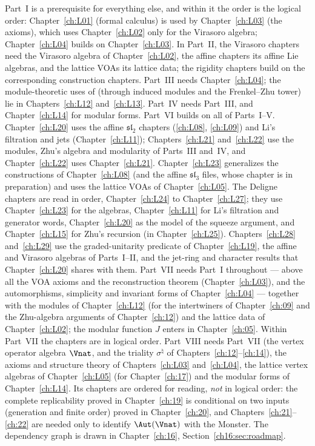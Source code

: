 Part~I is a prerequisite for everything else, and within it the order is the logical order:
Chapter~\ref{ch:L01} (formal calculus) is used by Chapter~\ref{ch:L03} (the axioms), which uses
Chapter~\ref{ch:L02} only for the Virasoro algebra; Chapter~\ref{ch:L04} builds on
Chapter~\ref{ch:L03}. In Part~II, the Virasoro chapters need the Virasoro algebra of
Chapter~\ref{ch:L02}, the affine chapters its affine Lie algebras, and the lattice VOAs its lattice
data; the rigidity chapters build on the corresponding construction chapters. Part~III needs
Chapter~\ref{ch:L04}; the module-theoretic uses of  (through induced modules and
the Frenkel--Zhu tower) lie in Chapters~\ref{ch:L12} and~\ref{ch:L13}.
Part~IV needs Part~III, and Chapter~\ref{ch:L14} for modular forms.
Part~VI builds on all of Parts~I--V. Chapter~\ref{ch:L20} uses the affine $\mathfrak{sl}_2$ chapters
(\ref{ch:L08}, \ref{ch:L09}) and Li's filtration and jets (Chapter~\ref{ch:L11}); Chapters~\ref{ch:L21}
and~\ref{ch:L22} use the modules, Zhu's algebra and modularity of Parts~III and~IV, and
Chapter~\ref{ch:L22} uses Chapter~\ref{ch:L21}. Chapter~\ref{ch:L23} generalizes the constructions of
Chapter~\ref{ch:L08} (and the affine $\mathfrak{sl}_3$ files, whose chapter is in preparation) and uses
the lattice VOAs of Chapter~\ref{ch:L05}. The Deligne
chapters are read in order, Chapter~\ref{ch:L24} to Chapter~\ref{ch:L27}; they use Chapter~\ref{ch:L23}
for the algebras, Chapter~\ref{ch:L11} for Li's filtration and generator words, Chapter~\ref{ch:L20} as
the model of the squeeze argument, and Chapter~\ref{ch:L15} for Zhu's recursion (in
Chapter~\ref{ch:L25}). Chapters~\ref{ch:L28} and~\ref{ch:L29} use the graded-unitarity
predicate of Chapter~\ref{ch:L19}, the affine and Virasoro algebras of Parts~I--II, and the jet-ring and character
results that Chapter~\ref{ch:L20} shares with them.
Part~VII needs Part~I throughout --- above all the VOA axioms and the
reconstruction theorem (Chapter~\ref{ch:L03}), and the automorphisms, simplicity and invariant
forms of Chapter~\ref{ch:L04} --- together with the modules of Chapter~\ref{ch:L12} (for the
intertwiners of Chapter~\ref{ch:09} and the Zhu-algebra arguments of Chapter~\ref{ch:12}) and the
lattice data of Chapter~\ref{ch:L02}; the modular function $J$ enters in Chapter~\ref{ch:05}. Within Part~VII the chapters
are in logical order.
Part~VIII needs Part~VII (the vertex operator algebra $\Vnat$, and the triality $\sigma^\natural$ of
Chapters~\ref{ch:12}--\ref{ch:14}), the axioms and structure theory of Chapters~\ref{ch:L03} and~\ref{ch:L04}, the
lattice vertex algebras of Chapter~\ref{ch:L05} (for Chapter~\ref{ch:17}) and the modular forms of
Chapter~\ref{ch:L14}. Its chapters are ordered for reading, \emph{not} in logical order: the complete replicability
proved in Chapter~\ref{ch:19} is conditional on two inputs (generation and finite order) proved in
Chapter~\ref{ch:20}, and Chapters~\ref{ch:21}--\ref{ch:22} are needed only to identify $\Aut(\Vnat)$ with the Monster.
The dependency graph is drawn in Chapter~\ref{ch:16}, Section~\ref{ch16:sec:roadmap}.

